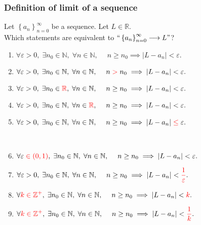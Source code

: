 \documentclass[14pt]{beamer}
\newcommand{\R}{\mathbb{R}}
\newcommand{\Z}{\mathbb{Z}}
\newcommand{\N}{\mathbb{N}}
\newcommand{\e}{\varepsilon}
\newcommand{\rojo}[1]{{\color{red} #1}}
\newcommand{\setsize}[1]{\fontsize{#1}{#1}\selectfont} %
\newcommand{\smallerfont}{\setsize{13}} %
\newcommand{\an}{\left\{ a_n \right\}_{n=0}^{\infty}}
\begin{document}
	\begin{frame}[t]
		\smallerfont
		\frametitle{Definition of limit of a sequence}

		Let ${\displaystyle \an}$ be a sequence. Let ${\displaystyle L \in \R}$. \\
		Which statements are equivalent to
		${\displaystyle ``\an \longrightarrow L"}$?

		\begin{enumerate}
			\item ${\displaystyle \forall \e>0, \; \exists n_0 \in \N, \; \forall n \in \N, \; \quad n \geq n_0 \implies |L-a_n| < \e.}$

			\item ${\displaystyle \forall \e>0, \; \exists n_0 \in \N, \; \forall n \in \N, \; \quad n \; \rojo{ > } \; n_0 \implies |L-a_n| < \e.}$

			\item ${\displaystyle \forall \e>0, \; \exists n_0 \in \rojo{\R}, \; \forall n \in \N, \; \quad n \geq n_0 \implies |L-a_n| < \e.}$

			\item ${\displaystyle \forall \e>0, \; \exists n_0 \in \N, \; \forall n \in \rojo{ \R}, \; \quad n \geq n_0 \implies |L-a_n| < \e.}$

			\item ${\displaystyle \forall \e>0, \; \exists n_0 \in \N, \; \forall n \in \N, \; \quad n \geq n_0 \implies |L-a_n| \; \rojo{\leq} \; \e.}$

				\


			\item ${\displaystyle \forall \e \; \rojo{\in (0,1)}, \; \exists n_0 \in \N, \; \forall n \in \N, \; \quad n \geq n_0 \implies |L-a_n| < \e.}$

			\item ${\displaystyle \forall \e>0, \; \exists n_0 \in \N, \; \forall n \in \N, \; \quad n \geq n_0 \implies |L-a_n| < \rojo{\frac{1}{\e}}.}$

			\item ${\displaystyle \forall \rojo{k \in \Z^{+}}, \; \exists n_0 \in \N, \; \forall n \in \N, \; \quad n \geq n_0 \implies |L-a_n| < \rojo{k}.}$

			\item ${\displaystyle \forall \rojo{k \in \Z^{+}}, \; \exists n_0 \in \N, \; \forall n \in \N, \; \quad n \geq n_0 \implies |L-a_n| < \rojo{\frac{1}{k}}.}$
		\end{enumerate}
	\end{frame}
\end{document}
